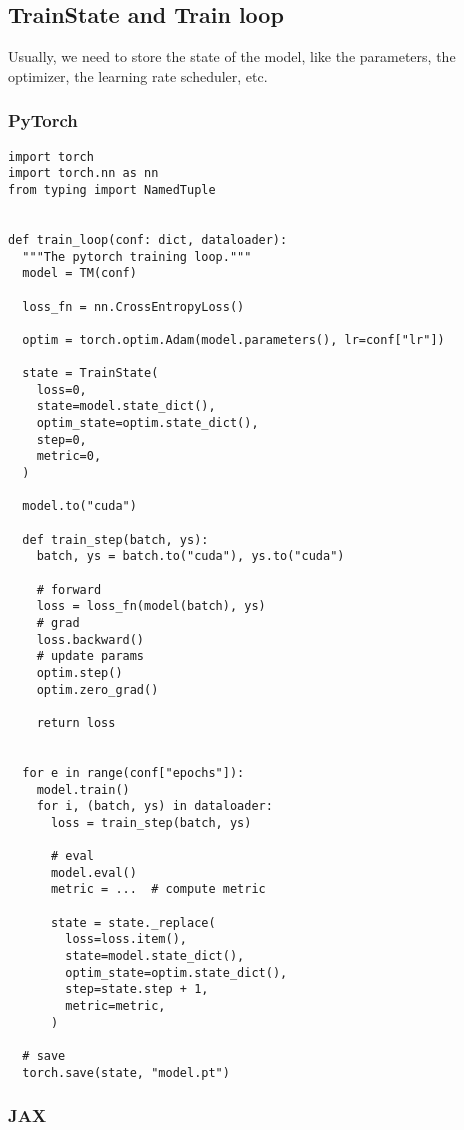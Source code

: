 \documentclass[11pt]{article}
\begin{document}
\subsection{TrainState and Train loop}
\label{sec:org17f69eb}

Usually, we need to store the state of the model, like the parameters, the optimizer, the learning rate scheduler, etc.
\subsubsection{PyTorch}
\label{sec:org903e14a}

\begin{verbatim}
import torch
import torch.nn as nn
from typing import NamedTuple


def train_loop(conf: dict, dataloader):
  """The pytorch training loop."""
  model = TM(conf)

  loss_fn = nn.CrossEntropyLoss()

  optim = torch.optim.Adam(model.parameters(), lr=conf["lr"])

  state = TrainState(
    loss=0,
    state=model.state_dict(),
    optim_state=optim.state_dict(),
    step=0,
    metric=0,
  )

  model.to("cuda")

  def train_step(batch, ys):
    batch, ys = batch.to("cuda"), ys.to("cuda")

    # forward
    loss = loss_fn(model(batch), ys)
    # grad
    loss.backward()
    # update params
    optim.step()
    optim.zero_grad()

    return loss


  for e in range(conf["epochs"]):
    model.train()
    for i, (batch, ys) in dataloader:
      loss = train_step(batch, ys)

      # eval
      model.eval()
      metric = ...  # compute metric

      state = state._replace(
        loss=loss.item(),
        state=model.state_dict(),
        optim_state=optim.state_dict(),
        step=state.step + 1,
        metric=metric,
      )

  # save
  torch.save(state, "model.pt")
\end{verbatim}
\subsubsection{JAX}
\label{sec:org157b54a}
\end{document}
